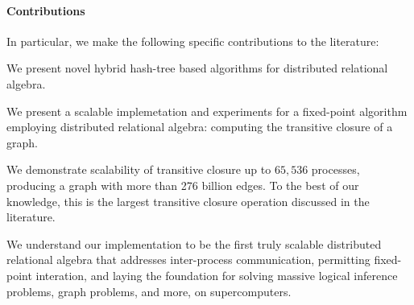\paragraph{Contributions} In particular, we make the following specific contributions to the literature:
\begin{tightenumerate}
	\item We present novel hybrid hash-tree based algorithms for distributed relational algebra.
	\item We present a scalable implemetation and experiments for a fixed-point algorithm employing distributed relational algebra: computing the transitive closure of a graph.
	\item We demonstrate scalability of transitive closure up to $65,\!536$ processes, producing a graph with more than 276 billion edges. To the best of our knowledge, this is the largest transitive closure operation discussed in the literature. 
\end{tightenumerate}

We understand our implementation to be the first truly scalable distributed relational algebra that addresses inter-process communication, permitting fixed-point interation, and laying the foundation for solving massive logical inference problems, graph problems, and more, on supercomputers.





